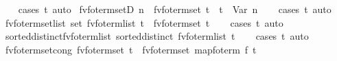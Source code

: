 \begin{isabellebody}
%
\isadelimproof
\ \ %
\endisadelimproof
%
\isatagproof
{}\isamarkupfalse%
\ {\isacharparenleft}{\kern0pt}cases\ t{\isacharparenright}{\kern0pt}\ auto%
\endisatagproof
{\isafoldproof}%
%
\isadelimproof
\isanewline
%
\endisadelimproof
\isanewline
{}\isamarkupfalse%
\ fv{\isacharunderscore}{\kern0pt}fo{\isacharunderscore}{\kern0pt}term{\isacharunderscore}{\kern0pt}setD{\isacharcolon}{\kern0pt}\ {\isachardoublequoteopen}n\ {\isasymin}\ fv{\isacharunderscore}{\kern0pt}fo{\isacharunderscore}{\kern0pt}term{\isacharunderscore}{\kern0pt}set\ t\ {\isasymLongrightarrow}\ t\ {\isacharequal}{\kern0pt}\ Var\ n{\isachardoublequoteclose}\isanewline
%
\isadelimproof
\ \ %
\endisadelimproof
%
\isatagproof
{}\isamarkupfalse%
\ {\isacharparenleft}{\kern0pt}cases\ t{\isacharparenright}{\kern0pt}\ auto%
\endisatagproof
{\isafoldproof}%
%
\isadelimproof
\isanewline
%
\endisadelimproof
\isanewline
{}\isamarkupfalse%
\ fv{\isacharunderscore}{\kern0pt}fo{\isacharunderscore}{\kern0pt}term{\isacharunderscore}{\kern0pt}set{\isacharunderscore}{\kern0pt}list{\isacharcolon}{\kern0pt}\ {\isachardoublequoteopen}set\ {\isacharparenleft}{\kern0pt}fv{\isacharunderscore}{\kern0pt}fo{\isacharunderscore}{\kern0pt}term{\isacharunderscore}{\kern0pt}list\ t{\isacharparenright}{\kern0pt}\ {\isacharequal}{\kern0pt}\ fv{\isacharunderscore}{\kern0pt}fo{\isacharunderscore}{\kern0pt}term{\isacharunderscore}{\kern0pt}set\ t{\isachardoublequoteclose}\isanewline
%
\isadelimproof
\ \ %
\endisadelimproof
%
\isatagproof
{}\isamarkupfalse%
\ {\isacharparenleft}{\kern0pt}cases\ t{\isacharparenright}{\kern0pt}\ auto%
\endisatagproof
{\isafoldproof}%
%
\isadelimproof
\isanewline
%
\endisadelimproof
\isanewline
{}\isamarkupfalse%
\ sorted{\isacharunderscore}{\kern0pt}distinct{\isacharunderscore}{\kern0pt}fv{\isacharunderscore}{\kern0pt}fo{\isacharunderscore}{\kern0pt}term{\isacharunderscore}{\kern0pt}list{\isacharcolon}{\kern0pt}\ {\isachardoublequoteopen}sorted{\isacharunderscore}{\kern0pt}distinct\ {\isacharparenleft}{\kern0pt}fv{\isacharunderscore}{\kern0pt}fo{\isacharunderscore}{\kern0pt}term{\isacharunderscore}{\kern0pt}list\ t{\isacharparenright}{\kern0pt}{\isachardoublequoteclose}\isanewline
%
\isadelimproof
\ \ %
\endisadelimproof
%
\isatagproof
{}\isamarkupfalse%
\ {\isacharparenleft}{\kern0pt}cases\ t{\isacharparenright}{\kern0pt}\ auto%
\endisatagproof
{\isafoldproof}%
%
\isadelimproof
\isanewline
%
\endisadelimproof
\isanewline
{}\isamarkupfalse%
\ fv{\isacharunderscore}{\kern0pt}fo{\isacharunderscore}{\kern0pt}term{\isacharunderscore}{\kern0pt}set{\isacharunderscore}{\kern0pt}cong{\isacharcolon}{\kern0pt}\ {\isachardoublequoteopen}fv{\isacharunderscore}{\kern0pt}fo{\isacharunderscore}{\kern0pt}term{\isacharunderscore}{\kern0pt}set\ t\ {\isacharequal}{\kern0pt}\ fv{\isacharunderscore}{\kern0pt}fo{\isacharunderscore}{\kern0pt}term{\isacharunderscore}{\kern0pt}set\ {\isacharparenleft}{\kern0pt}map{\isacharunderscore}{\kern0pt}fo{\isacharunderscore}{\kern0pt}term\ f\ t{\isacharparenright}{\kern0pt}{\isachardoublequoteclose}\isanewline

\end{isabellebody}
